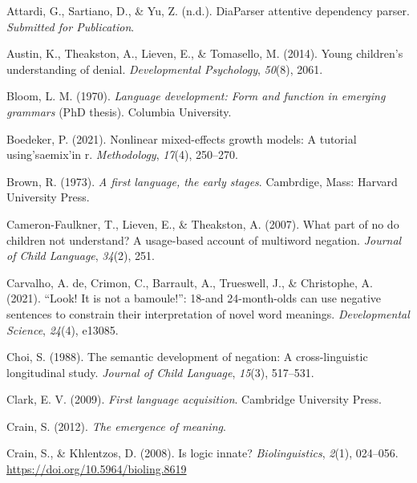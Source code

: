 \documentclass[
  man,floatsintext]{apa6}
\newlength{\cslhangindent}
\newlength{\cslentryspacingunit} %
\newenvironment{CSLReferences}[2] %
 {%
  \setlength{\parindent}{0pt}
  \ifodd #1
  \let\oldpar\par
  \def\par{\hangindent=\cslhangindent\oldpar}
  \fi
  \setlength{\parskip}{#2\cslentryspacingunit}
 }%
 {}
\begin{document}
\hypertarget{refs}{}
\begin{CSLReferences}{1}{0}
\leavevmode{}%
Attardi, G., Sartiano, D., \& Yu, Z. (n.d.). DiaParser attentive dependency parser. \emph{Submitted for Publication}.

\leavevmode{}%
Austin, K., Theakston, A., Lieven, E., \& Tomasello, M. (2014). Young children's understanding of denial. \emph{Developmental Psychology}, \emph{50}(8), 2061.

\leavevmode{}%
Bloom, L. M. (1970). \emph{Language development: Form and function in emerging grammars} (PhD thesis). Columbia University.

\leavevmode{}%
Boedeker, P. (2021). Nonlinear mixed-effects growth models: A tutorial using'saemix'in r. \emph{Methodology}, \emph{17}(4), 250--270.

\leavevmode{}%
Brown, R. (1973). \emph{A first language, the early stages}. Cambrdige, Mass: Harvard University Press.

\leavevmode{}%
Cameron-Faulkner, T., Lieven, E., \& Theakston, A. (2007). What part of no do children not understand? A usage-based account of multiword negation. \emph{Journal of Child Language}, \emph{34}(2), 251.

\leavevmode{}%
Carvalho, A. de, Crimon, C., Barrault, A., Trueswell, J., \& Christophe, A. (2021). {``Look! It is not a bamoule!''}: 18-and 24-month-olds can use negative sentences to constrain their interpretation of novel word meanings. \emph{Developmental Science}, \emph{24}(4), e13085.

\leavevmode{}%
Choi, S. (1988). The semantic development of negation: A cross-linguistic longitudinal study. \emph{Journal of Child Language}, \emph{15}(3), 517--531.

\leavevmode{}%
Clark, E. V. (2009). \emph{First language acquisition}. Cambridge University Press.

\leavevmode{}%
Crain, S. (2012). \emph{The emergence of meaning}.

\leavevmode{}%
Crain, S., \& Khlentzos, D. (2008). Is logic innate? \emph{Biolinguistics}, \emph{2}(1), 024--056. \url{https://doi.org/10.5964/bioling.8619}


\end{CSLReferences}
\end{document}
